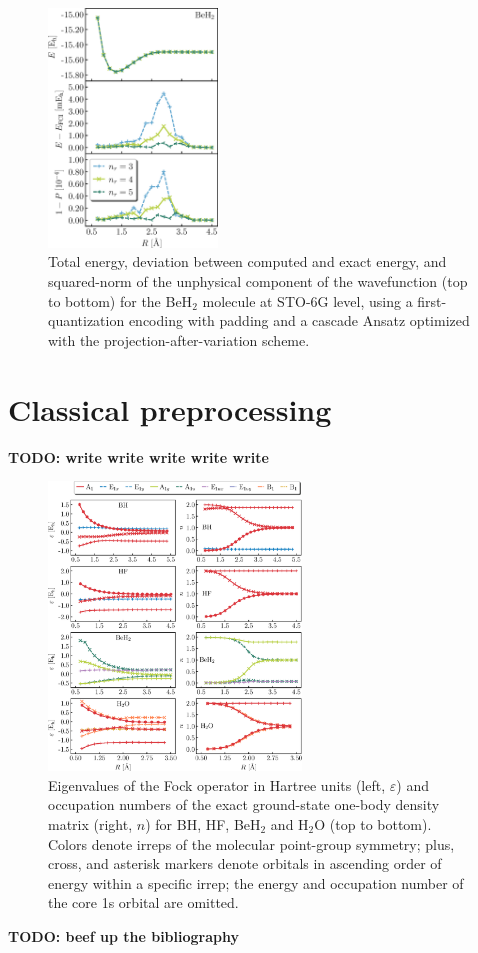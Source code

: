 \documentclass[aps,pra,onecolumn]{revtex4-2}
\newcommand{\todo}[1]{{\bf{{\color{red}TODO: #1}}}}
\begin{document}
\begin{figure}[t!]
\includegraphics[width=0.4\textwidth]{../figures/first_quantization_pad_pav/first_quantization_pad_pav.eps}
\caption{Total energy, deviation between computed and exact energy, and squared-norm of the unphysical component of the wavefunction
(top to bottom) for the BeH$_2$ molecule at STO-6G level, 
using a first-quantization encoding with padding and a cascade Ansatz optimized with the projection-after-variation scheme.}
\label{figure:pad_pav}
\end{figure} 

\section{Classical preprocessing}
\label{sec:classical}

\todo{write write write write write}

\begin{figure}[t!]
\includegraphics[width=0.6\textwidth]{../figures/scf_fci/scf_fci.eps}
\caption{Eigenvalues of the Fock operator in Hartree units (left, $\varepsilon$) and occupation numbers of the exact ground-state one-body density matrix (right, $n$) 
for BH, HF, BeH$_2$ and H$_2$O (top to bottom). 
Colors denote irreps of the molecular point-group symmetry;
plus, cross, and asterisk markers denote orbitals in ascending order of energy within a specific irrep;
the energy and occupation number of the core 1s orbital are omitted.}
\label{figure:scf}
\end{figure}



\todo{beef up the bibliography}


\end{document}
